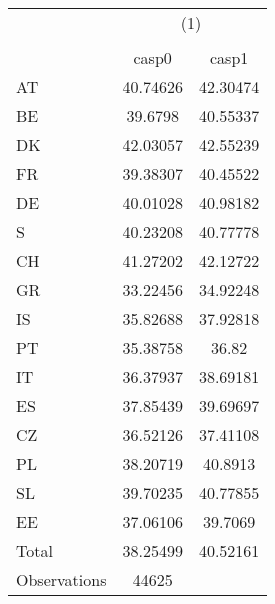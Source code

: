 {
\def\sym#1{\ifmmode^{#1}\else\(^{#1}\)\fi}
\begin{tabular}{l*{1}{cc}}
\hline\hline
                    &\multicolumn{2}{c}{(1)}  \\
                    &\multicolumn{2}{c}{}     \\
                    &       casp0&       casp1\\
\hline
AT                  &    40.74626&    42.30474\\
BE                  &     39.6798&    40.55337\\
DK                  &    42.03057&    42.55239\\
FR                  &    39.38307&    40.45522\\
DE                  &    40.01028&    40.98182\\
S                   &    40.23208&    40.77778\\
CH                  &    41.27202&    42.12722\\
GR                  &    33.22456&    34.92248\\
IS                  &    35.82688&    37.92818\\
PT                  &    35.38758&       36.82\\
IT                  &    36.37937&    38.69181\\
ES                  &    37.85439&    39.69697\\
CZ                  &    36.52126&    37.41108\\
PL                  &    38.20719&     40.8913\\
SL                  &    39.70235&    40.77855\\
EE                  &    37.06106&     39.7069\\
Total               &    38.25499&    40.52161\\
\hline
Observations        &       44625&            \\
\hline\hline
\end{tabular}
}
